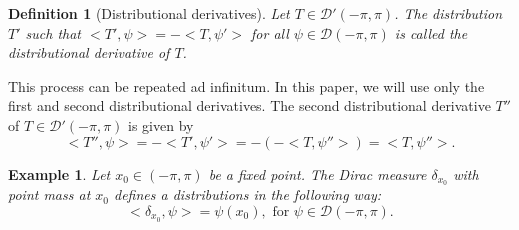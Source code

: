 \documentclass[11pt]{amsart}
\newtheorem{example}[theorem]{Example}
\newtheorem{definition}[theorem]{Definition}
\numberwithin{equation}{section}
\begin{document}
\begin{definition}[Distributional derivatives]
\textnormal{Let \(T\in\mathcal{D}'(-\pi,\pi)\). The distribution \(T'\) such that \(<T',\psi>=-<T,\psi'>\) for all \(\psi\in\mathcal{D}(-\pi,\pi)\) is called the distributional derivative of \(T\).}
\end{definition}
This process can be repeated ad infinitum. In this paper, we will use only the first and second distributional derivatives. The second distributional derivative \(T''\) of \(T\in\mathcal{D}'(-\pi,\pi)\) is given by
\[<T'',\psi>=-<T',\psi'>=-(-<T,\psi''>)=<T,\psi''>.\]
\begin{example}\textnormal{Let \(x_0\in (-\pi,\pi)\) be a fixed point. The Dirac measure \(\delta_{x_0}\) with point mass at \(x_0\) defines a distributions in the following way:
\[<\delta_{x_0},\psi>=\psi(x_0),\text{ for }\psi\in\mathcal{D}(-\pi,\pi).\]}
\end{example}
\end{document}
